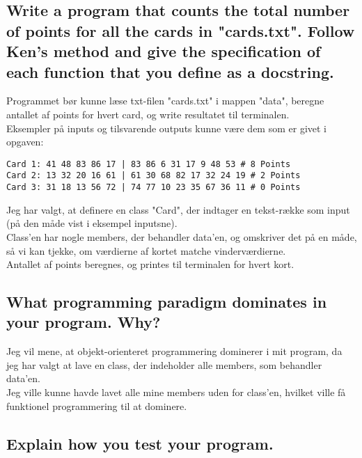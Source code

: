 \documentclass[a4paper,12pt]{article}
\begin{document}
\subsection[Write a program that counts the total number of points for all the cards]{Write a program that counts the total number of points for all the cards in "cards.txt".
Follow Ken's method and give the specification of each function that you define as a docstring.}

Programmet bør kunne læse txt-filen "cards.txt" i mappen "data", beregne antallet af points for hvert card, og write resultatet til terminalen.\\
Eksempler på inputs og tilsvarende outputs kunne være dem som er givet i opgaven:
\begin{lstlisting}
Card 1: 41 48 83 86 17 | 83 86 6 31 17 9 48 53 # 8 Points
Card 2: 13 32 20 16 61 | 61 30 68 82 17 32 24 19 # 2 Points
Card 3: 31 18 13 56 72 | 74 77 10 23 35 67 36 11 # 0 Points
\end{lstlisting} 
Jeg har valgt, at definere en class "Card", der indtager en tekst-række som input (på den måde vist i eksempel inputsne).\\
Class'en har nogle members, der behandler data'en, og omskriver det på en måde, så vi kan tjekke, om værdierne af kortet matche vinderværdierne.\\
Antallet af points beregnes, og printes til terminalen for hvert kort.

\subsection[What programming paradigm dominates in your program]{What programming paradigm dominates in your program. Why?}

Jeg vil mene, at objekt-orienteret programmering dominerer i mit program, da jeg har valgt at lave en class, der indeholder alle members, som behandler data'en.\\
Jeg ville kunne havde lavet alle mine members uden for class'en, hvilket ville få funktionel programmering til at dominere.

\subsection[Explain how you test your program]{Explain how you test your program.}
\end{document}
